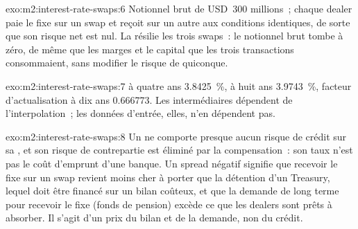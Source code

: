\begin{solution}{exo:m2:interest-rate-swaps:6}
Notionnel brut de USD~300 millions~; chaque dealer paie le fixe sur un swap et reçoit
sur un autre aux conditions identiques, de sorte que son risque net est nul. La  résilie
les trois swaps~: le notionnel brut tombe à zéro, de même que les marges et le capital
que les trois transactions consommaient, sans modifier le risque de quiconque.
\end{solution}

\begin{solution}{exo:m2:interest-rate-swaps:7}
 à quatre ans 3.8425~\%, à huit ans 3.9743~\%, facteur d'actualisation à dix ans
0.666773. Les  intermédiaires dépendent de l'interpolation~; les données
d'entrée, elles, n'en dépendent pas.
\end{solution}

\begin{solution}{exo:m2:interest-rate-swaps:8}
Un  ne comporte presque aucun risque de crédit sur sa , et son
risque de contrepartie est éliminé par la compensation~: son taux n'est pas le coût d'emprunt
d'une banque. Un spread négatif signifie que recevoir le fixe sur un swap revient moins cher à porter
que la détention d'un Treasury, lequel doit être financé sur un bilan coûteux, et que la demande
de long terme pour recevoir le fixe (fonds de pension) excède ce que les dealers
sont prêts à absorber. Il s'agit d'un prix du bilan et de la demande, non du crédit.
\end{solution}

